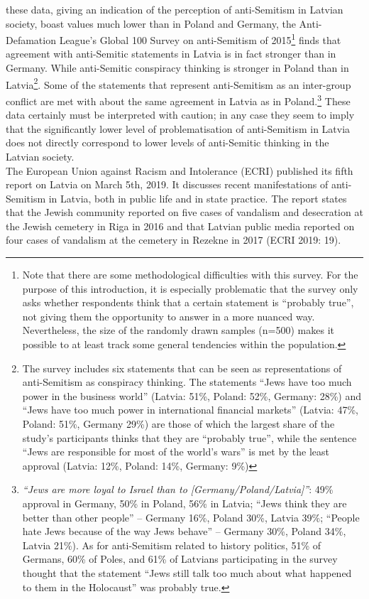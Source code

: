 these data, giving an indication of the perception of anti-Semitism in Latvian society, boast values much lower than in Poland and Germany, the Anti-Defamation League’s Global 100 Survey on anti-Semitism of 2015\footnote{Note that there are some methodological difficulties with this survey. For the purpose of this introduction, it is especially problematic that the survey only asks whether respondents think that a certain statement is ``probably true'', not giving them the opportunity to answer in a more nuanced way. Nevertheless, the size of the randomly drawn samples (n=500) makes it possible to at least track some general tendencies within the population.} finds that agreement with anti-Semitic statements in Latvia is in fact stronger than in Germany. While anti-Semitic conspiracy thinking is stronger in Poland than in Latvia\footnote{The survey includes six statements that can be seen as representations of anti-Semitism as conspiracy thinking. The statements ``Jews have too much power in the business world'' (Latvia: 51\%, Poland: 52\%, Germany: 28\%) and ``Jews have too much power in international financial markets'' (Latvia: 47\%, Poland: 51\%, Germany 29\%) are those of which the largest share of the study’s participants thinks that they are ``probably true'', while the sentence ``Jews are responsible for most of the world's wars'' is met by the least approval (Latvia: 12\%, Poland: 14\%, Germany: 9\%)}. Some of the statements that represent anti-Semitism as an inter-group conflict are met with about the same agreement in Latvia as in Poland.\footnote{\textit{``Jews are more loyal to Israel than to [Germany/Poland/Latvia]''}: 49\% approval in Germany, 50\% in Poland, 56\% in Latvia; ``Jews think they are better than other people'' – Germany 16\%, Poland 30\%, Latvia 39\%; ``People hate Jews because of the way Jews behave'' – Germany 30\%, Poland 34\%, Latvia 21\%). As for anti-Semitism related to history politics, 51\% of Germans, 60\% of Poles, and 61\% of Latvians participating in the survey thought that the statement ``Jews still talk too much about what happened to them in the Holocaust'' was probably true.}  These data certainly must be interpreted with caution; in any case they seem to imply that the significantly lower level of problematisation of anti-Semitism in Latvia does not directly correspond to lower levels of anti-Semitic thinking in the Latvian society.  \\
The European Union against Racism and Intolerance (ECRI) published its fifth report on Latvia on March 5th, 2019. It discusses recent manifestations of anti-Semitism in Latvia, both in public life and in state practice. The report states that the Jewish community reported on five cases of vandalism and desecration at the Jewish cemetery in Riga in 2016 and that Latvian public media reported on four cases of vandalism at the cemetery in Rezekne in 2017 (ECRI 2019: 19).\\
